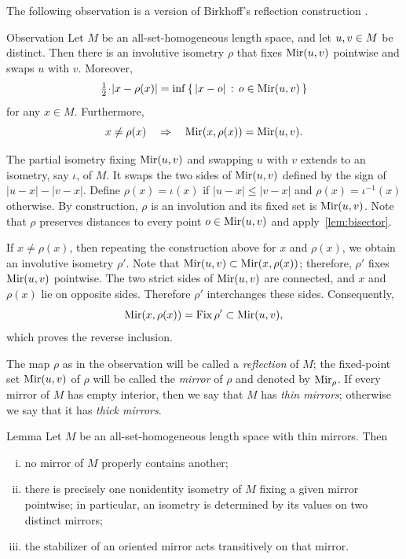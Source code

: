 \documentclass[a4paper,10pt]{article}
\begin{document}
The following observation is a version of Birkhoff's reflection construction
\cite[Theorem 20]{birkhoff}.

\begin{thm}{Observation}\label{lem:reflection}
Let $M$ be an all-set-homogeneous length space, and let $u,v\z\in M$ be distinct.
Then there is an involutive isometry $\rho$ that fixes $\mathrm{Mir}(u,v)$ pointwise and swaps $u$ with $v$.
Moreover,
\[\tfrac12\cdot |x-\rho(x)|=\inf\set{|x-o|}{o\in \Bis(u,v)}\]
for any $x\in M$.
Furthermore,
\[x\ne \rho(x)
\quad\Rightarrow\quad
\mathrm{Mir}(x,\rho(x))=\mathrm{Mir}(u,v).\]
\end{thm}

The partial isometry fixing $\mathrm{Mir}(u,v)$ and swapping $u$ with $v$ extends to an isometry, say $\iota$, of $M$.
It swaps the two sides of $\mathrm{Mir}(u,v)$ defined by the sign of $|u-x|-|v-x|$.
Define $\rho(x)=\iota(x)$ if $|u-x|\leqslant |v-x|$ and $\rho(x)=\iota^{-1}(x)$ otherwise.
By construction, $\rho$ is an involution and its fixed set is $\mathrm{Mir}(u,v)$.
Note that $\rho$ preserves distances to every point $o\in \mathrm{Mir}(u,v)$ and apply~\ref{lem:bisector}.

If $x\ne \rho(x)$, then repeating the construction above for $x$ and $\rho(x)$, we obtain an involutive isometry $\rho'$.
Note that $\mathrm{Mir}(u,v)\subset\mathrm{Mir}(x,\rho(x))$; therefore, $\rho'$ fixes $\mathrm{Mir}(u,v)$ pointwise.
The two strict sides of $\mathrm{Mir}(u,v)$ are connected,
and $x$ and $\rho(x)$ lie on opposite sides.
Therefore $\rho'$ interchanges these sides.
Consequently,
\[
\mathrm{Mir}(x,\rho(x))=\mathrm{Fix}\,\rho'\subset\mathrm{Mir}(u,v),
\]
which proves the reverse inclusion.
\qeds

The map $\rho$ as in the observation will be called a \emph{reflection} of $M$; the fixed-point set $\mathrm{Mir}(u,v)$ of $\rho$ will be called the \emph{mirror} of $\rho$ and denoted by $\mathrm{Mir}_\rho$.
If every mirror of $M$ has empty interior, then we say that $M$ has \emph{thin mirrors};
otherwise we say that it has \emph{thick mirrors}.

\begin{thm}{Lemma}\label{lem:rigidity}
Let $M$ be an all-set-homogeneous length space with thin mirrors.
Then
\begin{enumerate}[(i)]
\item no mirror of $M$ properly contains another;
\item there is precisely one nonidentity isometry of $M$ fixing a given mirror pointwise; in particular, an isometry is determined by its values on two distinct mirrors;
\item the stabilizer of an oriented mirror acts transitively on that mirror.
\end{enumerate}

\end{thm}
\end{document}
